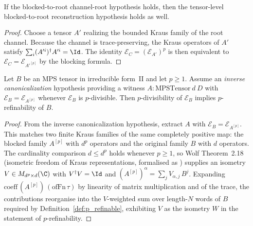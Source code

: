 \begin{theorem}
    \label{thm:peripheral_equalcase_root_from_root_channel}
    \leanok
    If the blocked-to-root channel-root hypothesis holds, then the tensor-level
    blocked-to-root reconstruction hypothesis holds as well.
\end{theorem}

\begin{proof}\leanok
    Choose a tensor $A'$ realizing the bounded Kraus family of the root channel.
    Because the channel is trace-preserving, the Kraus operators of $A'$ satisfy
    $\sum_i (A'^i)^\dagger A'^i = \Id$. The identity
    $\mathcal E_C = (\mathcal E_{A'})^p$ is then equivalent to
    $\mathcal E_C = \mathcal E_{A'^{[p]}}$ by the blocking formula.
\end{proof}

\begin{theorem}%
    \label{thm:thm_4_1_p_refinement_reverse}
    \leanok
    Let $B$ be an MPS tensor in irreducible form~II and let $p \ge 1$.
    Assume an \emph{inverse canonicalization} hypothesis providing a witness
    $A : \mathrm{MPSTensor}\ d\ D$ with
    $\mathcal{E}_B = \mathcal{E}_{A^{[p]}}$ whenever $\mathcal{E}_B$ is
    $p$-divisible. Then $p$-divisibility of $\mathcal{E}_B$ implies
    $p$-refinability of $B$.
\end{theorem}

\begin{proof}\leanok
    From the inverse canonicalization hypothesis, extract $A$ with
    $\mathcal{E}_B = \mathcal{E}_{A^{[p]}}$. This matches two finite Kraus
    families of the same completely positive map: the blocked family $A^{[p]}$
    with $d^{p}$ operators and the original family $B$ with $d$ operators.
    The cardinality comparison $d \le d^{p}$ holds whenever $p \ge 1$, so Wolf
    Theorem~2.18 (isometric freedom of Kraus representations, formalised as
    ) supplies an isometry
    $V \in M_{d^p \times d}(\C)$ with $V^{\dagger} V = \Id$ and
    $(A^{[p]})^{\alpha} = \sum_{j} V_{\alpha,j}\, B^{j}$. Expanding
    $\mathrm{coeff}\,(A^{[p]})\,(\mathrm{ofFn}\,\tau)$ by linearity of matrix
    multiplication and of the trace, the contributions reorganise into the
    $V$-weighted sum over length-$N$ words of $B$ required by
    Definition~\ref{def:p_refinable}, exhibiting $V$ as the isometry $W$ in the
    statement of $p$-refinability.
\end{proof}


